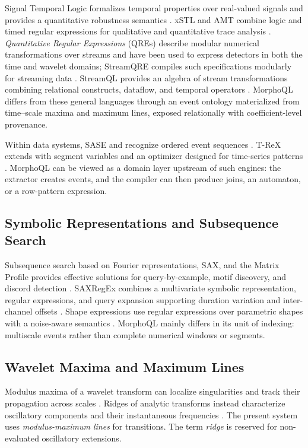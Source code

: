 Signal Temporal Logic formalizes temporal properties over real-valued signals and provides a quantitative robustness semantics \cite{maler2004,donze2010}. xSTL and AMT combine logic and timed regular expressions for qualitative and quantitative trace analysis \cite{nickovic2018}. \emph{Quantitative Regular Expressions} (QREs) describe modular numerical transformations over streams and have been used to express detectors in both the time and wavelet domains; StreamQRE compiles such specifications modularly for streaming data \cite{abbas2019,mamouras2017}. StreamQL provides an algebra of stream transformations combining relational constructs, dataflow, and temporal operators \cite{kong2020}. MorphoQL differs from these general languages through an event ontology materialized from time--scale maxima and maximum lines, exposed relationally with coefficient-level provenance.

Within data systems, SASE and  recognize ordered event sequences \cite{gyllstrom2007,petkovic2022}. T-ReX extends  with segment variables and an optimizer designed for time-series patterns \cite{huang2023}. MorphoQL can be viewed as a domain layer upstream of such engines: the extractor creates events, and the compiler can then produce joins, an automaton, or a row-pattern expression.

\subsection{Symbolic Representations and Subsequence Search}

Subsequence search based on Fourier representations, SAX, and the Matrix Profile provides effective solutions for query-by-example, motif discovery, and discord detection \cite{faloutsos1994,lin2007,yeh2016}. SAXRegEx combines a multivariate symbolic representation, regular expressions, and query expansion supporting duration variation and inter-channel offsets \cite{yu2023}. Shape expressions use regular expressions over parametric shapes with a noise-aware semantics \cite{nickovic2021}. MorphoQL mainly differs in its unit of indexing: multiscale events rather than complete numerical windows or segments.

\subsection{Wavelet Maxima and Maximum Lines}

Modulus maxima of a wavelet transform can localize singularities and track their propagation across scales \cite{mallat1992}. Ridges of analytic transforms instead characterize oscillatory components and their instantaneous frequencies \cite{lilly2010,lilly2017}. The present system uses \emph{modulus-maximum lines} for transitions. The term \emph{ridge} is reserved for non-evaluated oscillatory extensions.

